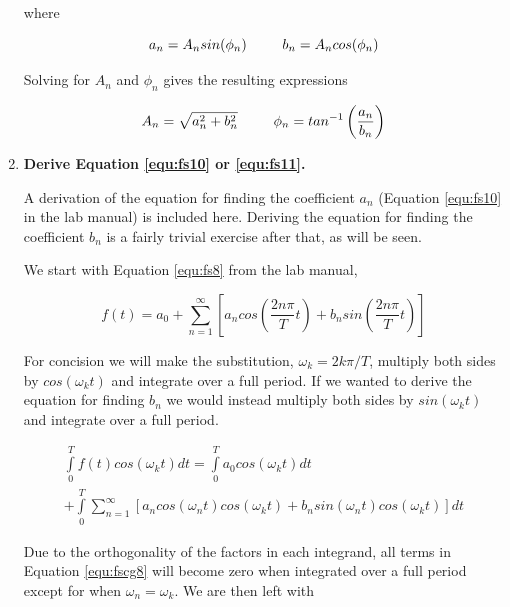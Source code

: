 \begin{enumerate}
\noindent where

\begin{equation}
a_n=A_nsin(\phi_n)\hspace{9mm}b_n=A_ncos(\phi_n)
\label{fscg5}
\end{equation}

\noindent Solving for $A_n$ and $\phi_n$ gives the resulting expressions

\begin{equation}
A_n=\sqrt{a_n^2+b_n^2}\hspace{9mm}\phi_n=tan^{-1}\left(\dfrac{a_n}{b_n}\right)
\label{fscg6}
\end{equation}

\item {\bf Derive Equation \ref{equ:fs10} or \ref{equ:fs11}.}\newline

A derivation of the equation for finding the coefficient $a_n$ (Equation \ref{equ:fs10} in the lab manual) is included here. Deriving the equation for finding the coefficient $b_n$ is a fairly trivial exercise after that, as will be seen.

We start with Equation \ref{equ:fs8} from the lab manual,

\begin{equation}
f(t)=a_0+\sum\limits_{n=1}^{\infty}\left[a_ncos\left(\dfrac{2n\pi}{T}t\right)+b_nsin\left(\dfrac{2n\pi}{T}t\right)\right]
\label{equ:fscg7}
\end{equation}

\noindent For concision we will make the substitution, $\omega_k=2k\pi/T$, multiply both sides by $cos(\omega_kt)$ and integrate over a full period. If we wanted to derive the equation for finding $b_n$ we would instead multiply both sides by $sin(\omega_kt)$ and integrate over a full period.


\begin{multline}
\int\limits_0^Tf(t)cos(\omega_kt)dt=\int\limits_0^Ta_0cos(\omega_kt)dt\\+\int\limits_0^T\sum\limits_{n=1}^{\infty}\left[a_ncos(\omega_nt)cos(\omega_kt)+b_nsin(\omega_nt)cos(\omega_kt)\right]dt
\label{equ:fscg8}
\end{multline}

\noindent Due to the orthogonality of the factors in each integrand, all terms in Equation \ref{equ:fscg8} will become zero when integrated over a full period except for when $\omega_n=\omega_k$. We are then left with



\end{enumerate}

